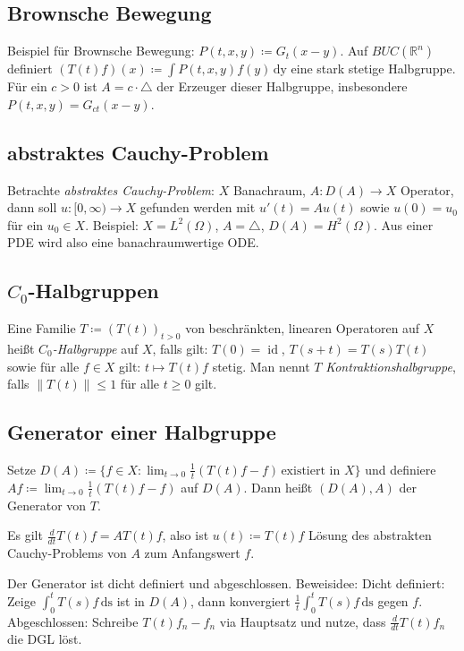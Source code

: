 \documentclass[11pt,a4paper]{scrartcl}
\newcommand{\R}{\mathbb{R}} %
\theoremstyle{plain}
\theoremstyle{definition}
\theoremstyle{remark}
\DeclareMathOperator{\id}{id}
\begin{document}
\subsection{Brownsche Bewegung}

Beispiel für Brownsche Bewegung: $P(t,x,y)\coloneqq G_t(x-y)$. Auf $BUC(\R^n)$ definiert $(T(t)f)(x)\coloneqq \int P(t,x,y)f(y) \, \mathrm{dy}$ eine stark stetige Halbgruppe. Für ein $c > 0$ ist $A=c\cdot\triangle$ der Erzeuger dieser Halbgruppe, insbesondere $P(t,x,y) = G_{ct}(x-y)$.

\subsection{abstraktes Cauchy-Problem}

Betrachte \emph{abstraktes Cauchy-Problem}: $X$ Banachraum, $A:D(A) \to X$ Operator, dann soll $u: [0,\infty) \to X$ gefunden werden mit $u'(t) = Au(t)$ sowie $u(0)=u_0$ für ein $u_0\in X$. Beispiel: $X=L^2(\Omega)$, $A=\triangle$, $D(A)=H^2(\Omega)$. Aus einer PDE wird also eine banachraumwertige ODE.

\subsection{$C_0$-Halbgruppen}

Eine Familie $T\coloneqq (T(t))_{t>0}$ von beschränkten, linearen Operatoren auf $X$ heißt \emph{$C_0$-Halbgruppe} auf $X$, falls gilt: $T(0)=\id$, $T(s+t)=T(s)T(t)$ sowie für alle $f\in X$ gilt: $t\mapsto T(t)f$ stetig. Man nennt $T$ \emph{Kontraktionshalbgruppe}, falls $\|T(t)\| \leq 1$ für alle $t\geq 0$ gilt.

\subsection{Generator einer Halbgruppe}

Setze $D(A)\coloneqq \{ f\in X: \lim_{t\to 0} \frac{1}{t}(T(t)f-f) \, \text{existiert in } X \}$ und definiere $Af \coloneqq \lim_{t\to 0} \frac{1}{t}(T(t)f-f)$ auf $D(A)$. Dann heißt $(D(A),A)$ der Generator von $T$.

Es gilt $\frac{d}{dt} T(t)f = AT(t)f$, also ist $u(t)\coloneqq T(t)f$ Lösung des abstrakten Cauchy-Problems von $A$ zum Anfangswert $f$.

Der Generator ist dicht definiert und abgeschlossen. Beweisidee: Dicht definiert: Zeige $\int_0^t T(s)f \, \mathrm{ds}$ ist in $D(A)$, dann konvergiert $\frac{1}{t} \int_0^t T(s)f \, \mathrm{ds}$ gegen $f$. Abgeschlossen: Schreibe $T(t)f_n-f_n$ via Hauptsatz und nutze, dass $\frac{d}{dt} T(t)f_n$ die DGL löst.
\end{document}

